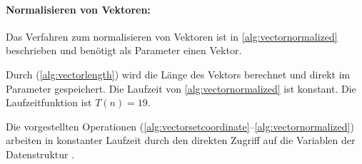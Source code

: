 
\paragraph{Normalisieren von Vektoren:} %
\label{par:normalisieren_von_vektoren}

Das Verfahren zum normalisieren von Vektoren ist in \autoref{alg:vectornormalized} beschrieben und benötigt als
 Parameter einen Vektor.

Durch  (\autoref{alg:vectorlength}) wird die Länge des Vektors berechnet und direkt im Parameter
 gespeichert. Die Laufzeit von \autoref{alg:vectornormalized} ist konstant. Die Laufzeitfunktion ist $T(n) = 19$.


Die vorgestellten Operationen (\autoref{alg:vectorsetcoordinate}--\autoref{alg:vectornormalized}) arbeiten in konstanter
 Laufzeit durch den direkten Zugriff auf die Variablen der Datenstruktur .

